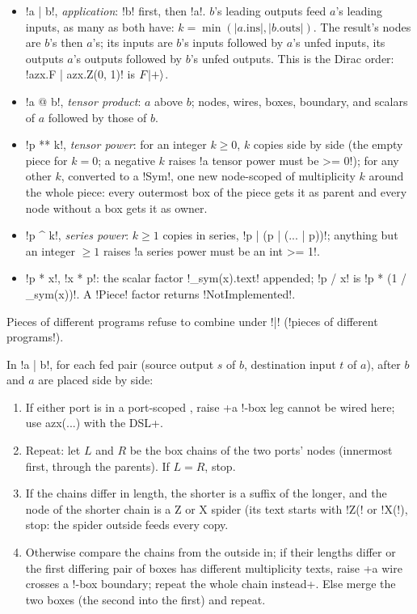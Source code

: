\begin{itemize}
\item \py!a | b!, \emph{application}: \py!b! first, then \py!a!. $b$'s leading outputs feed $a$'s leading inputs, as many as both have: $k=\min(|a.\text{ins}|,|b.\text{outs}|)$. The result's nodes are $b$'s then $a$'s; its inputs are $b$'s inputs followed by $a$'s unfed inputs, its outputs $a$'s outputs followed by $b$'s unfed outputs. This is the Dirac order: \py!azx.F | azx.Z(0, 1)! is $F\lvert + \rangle$.
\item \py!a @ b!, \emph{tensor product}: $a$ above $b$; nodes, wires, boxes, boundary, and scalars of $a$ followed by those of $b$.
\item \py!p ** k!, \emph{tensor power}: for an integer $k\ge0$, $k$ copies side by side (the empty piece for $k=0$; a negative $k$ raises \code!a tensor power must be >= 0!); for any other $k$, converted to a \py!Sym!, one new node-scoped \bbox{} of multiplicity $k$ around the whole piece: every outermost box of the piece gets it as parent and every node without a box gets it as owner.
\item \py!p ^ k!, \emph{series power}: $k\ge1$ copies in series, \py!p | (p | (... | p))!; anything but an integer $\ge1$ raises \code!a series power must be an int >= 1!.
\item \py!p * x!, \py!x * p!: the scalar factor \py!_sym(x).text! appended; \py!p / x! is \py!p * (1 / _sym(x))!. A \py!Piece! factor returns \py!NotImplemented!.
\end{itemize}
Pieces of different programs refuse to combine under \code!|! (\code!pieces of different programs!).

\begin{algorithm}\label{alg:python-api-apply}
\leavevmode
In \py!a | b!, for each fed pair (source output $s$ of $b$, destination input $t$ of $a$), after $b$ and $a$ are placed side by side:
\begin{enumerate}
\item If either port is in a port-scoped \bbox{}, raise \code+a !-box leg cannot be wired here; use azx(...) with the DSL+.
\item Repeat: let $L$ and $R$ be the box chains of the two ports' nodes (innermost first, through the parents). If $L=R$, stop.
\item If the chains differ in length, the shorter is a suffix of the longer, and the node of the shorter chain is a Z or X spider (its text starts with \code!Z(! or \code!X(!), stop: the spider outside feeds every copy.
\item Otherwise compare the chains from the outside in; if their lengths differ or the first differing pair of boxes has different multiplicity texts, raise \code+a wire crosses a !-box boundary; repeat the whole chain instead+. Else merge the two boxes (the second into the first) and repeat.
\end{enumerate}
\end{algorithm}

